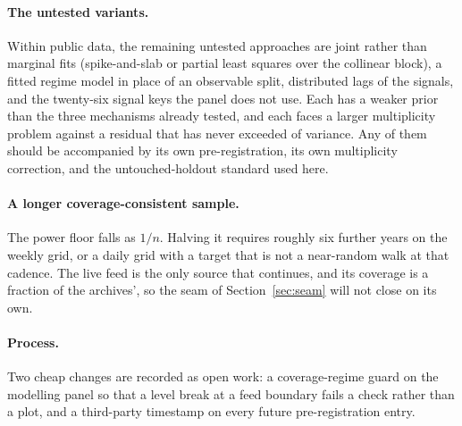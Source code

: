 \paragraph{The untested variants.} Within public data, the remaining untested
approaches are joint rather than marginal fits (spike-and-slab or partial least
squares over the collinear block), a fitted regime model in place of an observable
split, distributed lags of the signals, and the twenty-six signal keys the panel does
not use. Each has a weaker prior than the three mechanisms already tested, and each
faces a larger multiplicity problem against a residual that has never exceeded
\bMaxRsqCov{} of variance. Any of them should be accompanied by its own
pre-registration, its own multiplicity correction, and the untouched-holdout
standard used here.

\paragraph{A longer coverage-consistent sample.} The power floor falls as $1/n$.
Halving it requires roughly six further years on the weekly grid, or a daily grid
with a target that is not a near-random walk at that cadence. The live feed is the
only source that continues, and its coverage is a fraction of the archives', so the
seam of Section~\ref{sec:seam} will not close on its own.

\paragraph{Process.} Two cheap changes are recorded as open work: a coverage-regime
guard on the modelling panel so that a level break at a feed boundary fails a
check rather than a plot, and a third-party timestamp on every future
pre-registration entry.
